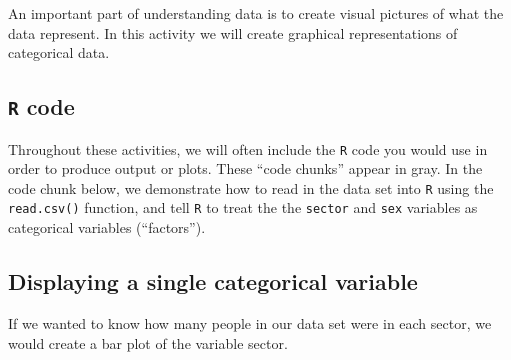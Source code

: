 \documentclass[
]{report}
\newenvironment{Shaded}{\begin{snugshade}}{\end{snugshade}}
\newcommand{\CommentTok}[1]{\textcolor[rgb]{0.56,0.35,0.01}{\textit{#1}}}
\newcommand{\KeywordTok}[1]{\textcolor[rgb]{0.13,0.29,0.53}{\textbf{#1}}}
\newcommand{\NormalTok}[1]{#1}
\newcommand{\OperatorTok}[1]{\textcolor[rgb]{0.81,0.36,0.00}{\textbf{#1}}}
\newcommand{\StringTok}[1]{\textcolor[rgb]{0.31,0.60,0.02}{#1}}
\begin{document}
\vspace{0.5in}

An important part of understanding data is to create visual pictures of what the data represent. In this activity we will create graphical representations of categorical data.

\hypertarget{r-code}{%
\subsection{\texorpdfstring{\texttt{R} code}{R code}}\label{r-code}}

Throughout these activities, we will often include the \texttt{R} code
you would use in order to produce output or plots. These
``code chunks'' appear in gray. In the code chunk below, we
demonstrate how to read in the data set into \texttt{R} using the \texttt{read.csv()} function, and tell \texttt{R} to treat the the \texttt{sector} and \texttt{sex} variables as categorical variables (``factors'').

\begin{Shaded}
\end{Shaded}

\newpage

\hypertarget{displaying-a-single-categorical-variable}{%
\subsection{Displaying a single categorical variable}\label{displaying-a-single-categorical-variable}}

If we wanted to know how many people in our data set were in each sector, we would create a bar plot of the variable sector.
\end{document}
